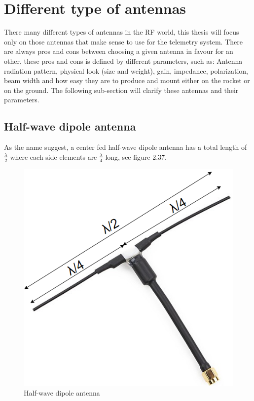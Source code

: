 \section{Different type of antennas}
There many different types of antennas in the RF world, this thesis will focus only on those antennas that make sense to use for the telemetry system. There are always pros and cons between choosing a given antenna in favour for an other, these pros and cons is defined by different parameters, such as: Antenna radiation pattern, physical look (size and weight), gain, impedance, polarization, beam width and how easy they are to produce and mount either on the rocket or on the ground. The following sub-section will clarify these antennas and their parameters.

\subsection{Half-wave dipole antenna}
As the name suggest, a center fed half-wave dipole antenna has a total length of $\frac{\lambda}{2}$ where each side elements are $\frac{\lambda}{4}$ long, see figure 2.37. 

\begin{figure}[h]
\centering
\includegraphics[scale=0.6]{figures/Dipole.PNG}
\caption{Half-wave dipole antenna}
\end{figure}

